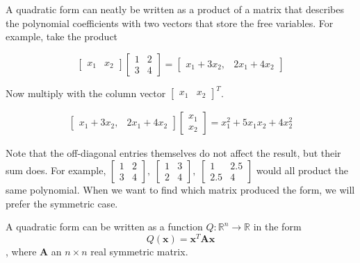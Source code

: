 \documentclass[a4paper]{article}
\numberwithin{equation}{section} %
\newcounter{example}
\begin{document}
A quadratic form can neatly be written as a product of a matrix that describes the polynomial coefficients with two vectors that store the free variables. For example, take the product

\[
\begin{bmatrix} x_{1} & x_2\end{bmatrix}
\begin{bmatrix} 1 & 2\\3 & 4\end{bmatrix}=
\begin{bmatrix}x_1 + 3x_2, & 2x_1 + 4x_2 \end{bmatrix}
\]

Now multiply with the column vector $\begin{bmatrix}x_1 & x_2 \end{bmatrix}^T$.

\[
\begin{split}
\begin{bmatrix}x_1 + 3x_2, & 2x_1 + 4x_2 \end{bmatrix}
\begin{bmatrix}x_1 \\ x_2 \end{bmatrix}=x_1^2+5x_{1}x_{2}+4x_2^2
\end{split}
\]

Note that the off-diagonal entries themselves do not affect the result, but their sum does. For example, $\begin{bmatrix} 1 & 2\\3 & 4\end{bmatrix}, \; \begin{bmatrix} 1 & 3\\2 & 4\end{bmatrix}, \; \begin{bmatrix} 1 & 2.5\\2.5 & 4\end{bmatrix}$ would all product the same polynomial. When we want to find which matrix produced the form, we will prefer the symmetric case.

\begin{corollary}
A quadratic form can be written as a function $Q: \mathbb{R}^{n}\rightarrow\mathbb{R}$ in the form
\begin{equation}
Q(\textbf{x})=\textbf{x}^{T}\textbf{Ax}
\end{equation}
, where $\textbf{A}$ an $n\times n$ real symmetric matrix.
\end{corollary}
\end{document}
